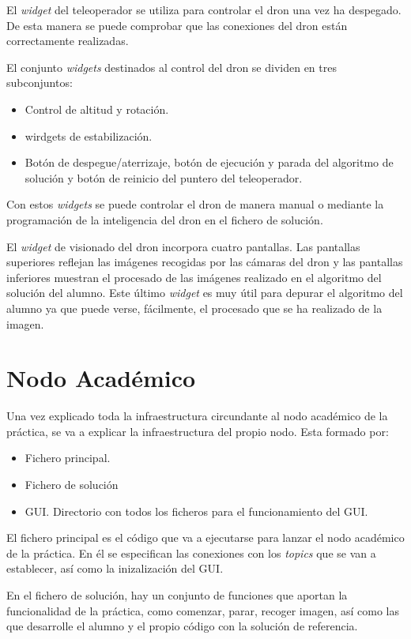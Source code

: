 El \textit{widget} del teleoperador se utiliza para controlar el dron una vez ha despegado. De esta manera se puede comprobar que las conexiones del dron están correctamente realizadas.

El conjunto \textit{widgets} destinados al control del dron se dividen en tres subconjuntos:
\begin{itemize}
    \item Control de altitud y rotación.
    \item wirdgets de estabilización.
    \item Botón de despegue/aterrizaje, botón de ejecución y parada del algoritmo de solución y botón de reinicio del puntero del teleoperador.
\end{itemize}
Con estos \textit{widgets} se puede controlar el dron de manera manual o mediante la programación de la inteligencia del dron en el fichero de solución.

El \textit{widget} de visionado del dron incorpora cuatro pantallas. Las pantallas superiores reflejan las imágenes recogidas por las cámaras del dron y las pantallas inferiores muestran el procesado de las imágenes realizado en el algoritmo del solución del alumno. Este último \textit{widget} es muy útil para depurar el algoritmo del alumno ya que puede verse, fácilmente, el procesado que se ha realizado de la imagen.

\section{Nodo Académico}
Una vez explicado toda la infraestructura circundante al nodo académico de la práctica, se va a explicar la infraestructura del propio nodo. Esta formado por:

\begin{itemize}
    \item Fichero principal.
    \item Fichero de solución
    \item GUI. Directorio con todos los ficheros para el funcionamiento del GUI.
\end{itemize}

El fichero principal es el código que va a ejecutarse para lanzar el nodo académico de la práctica. En él se especifican las conexiones con los \textit{topics} que se van a establecer, así como la inizalización del GUI.

En el fichero de solución, hay un conjunto de funciones que aportan la funcionalidad de la práctica, como comenzar, parar, recoger imagen, así como las que desarrolle el alumno y el propio código con la solución de referencia.

